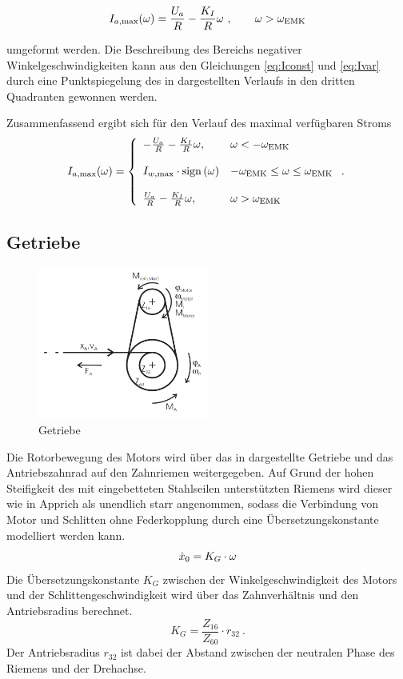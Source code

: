 \begin{equation}
	I_{a \mathrm{, max}}(\omega) = \frac{U_a}{R} - \frac{K_I}{R} \omega \ , \qquad \omega > \omega_{\mathrm{EMK}} 
	\label{eq:Ivar}
\end{equation}

umgeformt werden.
Die Beschreibung des Bereichs negativer Winkelgeschwindigkeiten kann aus den Gleichungen \eqref{eq:Iconst} und \eqref{eq:Ivar} durch eine Punktspiegelung des in  dargestellten Verlaufs in den dritten Quadranten gewonnen werden.

Zusammenfassend ergibt sich für den Verlauf des maximal verfügbaren Stroms  
\[
I_{a \mathrm{, max}}(\omega) = \left\{\begin{array}{lll}
														-\frac{U_a}{R} - \frac{K_I}{R} \omega, & \omega < -\omega_{\mathrm{EMK}}   \\ \\
														I_{w\mathrm{, max}} \cdot \mathrm{sign}\left(\omega\right) 	& -\omega_{\mathrm{EMK}} \leq \omega \leq \omega_{\mathrm{EMK}} \\ \\				
														\frac{U_a}{R} - \frac{K_I}{R} \omega, & \omega > \omega_{\mathrm{EMK}} \end{array}\right. . \
\] 

\subsection{Getriebe}

\begin{figure}[h]
	\centering
		\includegraphics[width=0.5\textwidth]{Bilder/Motor/Getriebe.PNG}
	\caption{Getriebe \cite{franke}}
	\label{fig:Getriebe}
\end{figure}

Die Rotorbewegung des Motors wird über das in  dargestellte Getriebe und das Antriebszahnrad auf den Zahnriemen weitergegeben. Auf Grund der hohen Steifigkeit des mit eingebetteten Stahlseilen unterstützten Riemens wird dieser wie in Apprich \cite{apprich} als unendlich starr angenommen, sodass die Verbindung von Motor und Schlitten ohne Federkopplung durch eine Übersetzungskonstante modelliert werden kann.
\[
	\dot{x}_0 = K_G \cdot \omega
\]
 Die Übersetzungskonstante $K_G$ zwischen der Winkelgeschwindigkeit des Motors und der Schlittengeschwindigkeit wird über das Zahnverhältnis und den Antriebsradius berechnet.
\[
	K_G =  \frac{Z_{16}}{Z_{60}} \cdot r_{32} \ .
\]
Der Antriebsradius $r_{32}$ ist dabei der Abstand zwischen der neutralen Phase des Riemens und der Drehachse.

